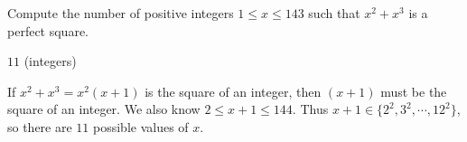 \documentclass[11pt]{article}
\begin{document}
\begin{problem}
Compute the number of positive integers $1 \le x \le 143$ such that $x^2 + x^3$ is a perfect square.
\end{problem}
\begin{answer}
$\boxed{11}$ (integers)
\end{answer}
\begin{solution}
If $x^2 + x^3 = x^2(x+1)$ is the square of an integer, then $(x+1)$ must be the square of an integer. We also know $2 \le x+1 \le 144$. Thus $x+1 \in \{2^2, 3^2, \cdots, 12^2\}$, so there are $\boxed{11}$ possible values of $x$.
\end{solution}
\end{document}
